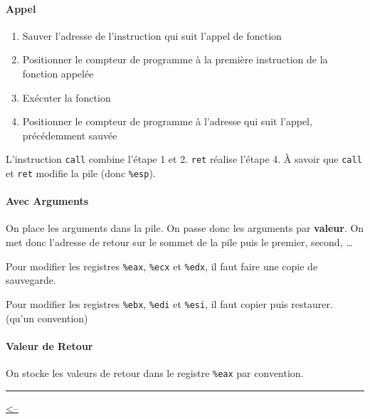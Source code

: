 \paragraph{Appel}\label{appel}

\begin{enumerate}
\def\labelenumi{\arabic{enumi}.}
\tightlist
\item
  Sauver l'adresse de l'instruction qui suit l'appel de fonction
\item
  Positionner le compteur de programme à la première instruction de la
  fonction appelée
\item
  Exécuter la fonction
\item
  Positionner le compteur de programme à l'adresse qui suit l'appel,
  précédemment sauvée
\end{enumerate}

L'instruction \texttt{call} combine l'étape 1 et 2. \texttt{ret} réalise
l'étape 4. À savoir que \texttt{call} et \texttt{ret} modifie la pile
(donc \texttt{\%esp}).

\begin{Shaded}
\begin{Highlighting}[]
\end{Highlighting}
\end{Shaded}

\paragraph{Avec Arguments}\label{avec-arguments}

On place les arguments dans la pile. On passe donc les arguments par
\textbf{valeur}. On met donc l'adresse de retour sur le sommet de la
pile puis le premier, second, \ldots{}

Pour modifier les registres \texttt{\%eax}, \texttt{\%ecx} et
\texttt{\%edx}, il faut faire une copie de sauvegarde.

Pour modifier les registres \texttt{\%ebx}, \texttt{\%edi} et
\texttt{\%esi}, il faut copier puis restaurer. (qu'un convention)

\paragraph{Valeur de Retour}\label{valeur-de-retour}

On stocke les valeurs de retour dans le registre \texttt{\%eax} par
convention.

\begin{center}\rule{0.5\linewidth}{0.5pt}\end{center}

\href{../README.md}{\textless--}
